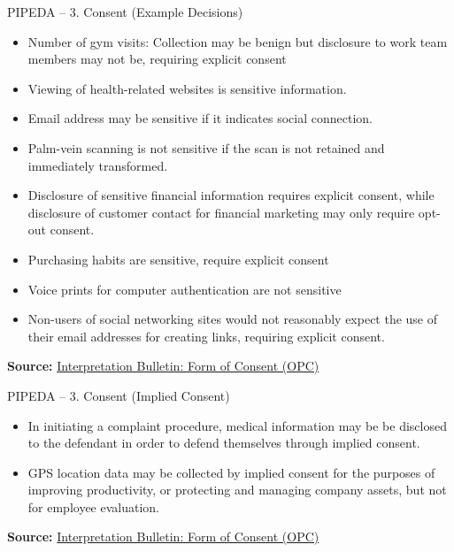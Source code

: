 \documentclass[ignorenonframetext,xcolor=x11names]{beamer}
\begin{document}
\begin{frame}[label=full]{PIPEDA -- 3. Consent \small (Example Decisions)}
\begin{itemize}
   \item Number of gym visits: Collection may be benign but disclosure to work team members may not be, requiring explicit consent
   \item Viewing of health-related websites is sensitive information.
   \item Email address may be sensitive if it indicates social connection.
   \item Palm-vein scanning is not sensitive if the scan is not retained and immediately transformed.
   \item Disclosure of sensitive financial information requires explicit consent, while disclosure of customer contact for financial marketing may only require opt-out consent.
   \item Purchasing habits are sensitive, require explicit consent
   \item Voice prints for computer authentication are not sensitive
   \item Non-users of social networking sites would not reasonably expect the use of their email addresses for creating links, requiring explicit consent.
\end{itemize}

\vspace{.5\baselineskip}
\scriptsize \textbf{Source:} \href{https://www.priv.gc.ca/en/privacy-topics/privacy-laws-in-canada/the-personal-information-protection-and-electronic-documents-act-pipeda/pipeda-compliance-help/pipeda-interpretation-bulletins/interpretations_07_consent/}{Interpretation Bulletin: Form of Consent (OPC)}
\end{frame}

\begin{frame}[label=full]{PIPEDA -- 3. Consent \small (Implied Consent)}
\begin{itemize}
   \item In initiating a complaint procedure, medical information may be be disclosed to the defendant in order to defend themselves through implied consent.
   \item GPS location data may be collected by implied consent for the purposes of improving productivity, or protecting and managing company assets, but not for employee evaluation.
\end{itemize}

\scriptsize \textbf{Source:} \href{https://www.priv.gc.ca/en/privacy-topics/privacy-laws-in-canada/the-personal-information-protection-and-electronic-documents-act-pipeda/pipeda-compliance-help/pipeda-interpretation-bulletins/interpretations_07_consent/}{Interpretation Bulletin: Form of Consent (OPC)}
\end{frame}
\end{document}
